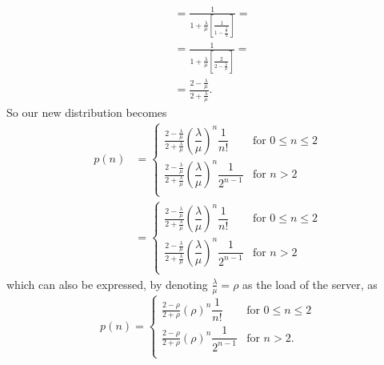 \documentclass[12pt]{article}
\begin{document}
\begin{enumerate}
\begin{align*}
			&=\frac{1}{1+\frac{\lambda}{\mu}\left[\frac{1}{1-\frac{\frac{\lambda}{\mu}}{2}}\right]}=\\
			&=\frac{1}{1+\frac{\lambda}{\mu}\left[\frac{2}{2-\frac{\lambda}{\mu}}\right]}=\\
			&=\frac{2-\frac{\lambda}{\mu}}{2+\frac{\lambda}{\mu}}.
		\end{align*}
		So our new distribution becomes
		\begin{align*}
			p(n)&=\begin{cases}
				\frac{2-\frac{\lambda}{\mu}}{2+\frac{\lambda}{\mu}}\left(\dfrac{\lambda}{\mu}\right)^{n}\dfrac{1}{n!}&\text{for }0\leqslant n\leqslant 2\\
				\frac{2-\frac{\lambda}{\mu}}{2+\frac{\lambda}{\mu}}\left(\dfrac{\lambda}{\mu}\right)^{n}\dfrac{1}{2^{n-1}}&\text{for }n> 2\\
			\end{cases}\\
			&=\begin{cases}
				\frac{2-\frac{\lambda}{\mu}}{2+\frac{\lambda}{\mu}}\left(\dfrac{\lambda}{\mu}\right)^{n}\dfrac{1}{n!}&\text{for }0\leqslant n\leqslant 2\\
				\frac{2-\frac{\lambda}{\mu}}{2+\frac{\lambda}{\mu}}\left(\dfrac{\lambda}{\mu}\right)^{n}\dfrac{1}{2^{n-1}}&\text{for }n> 2\\
			\end{cases}
		\end{align*}
		which can also be expressed, by denoting $\frac{\lambda}{\mu}=\rho$ as the load of the server, as
		\begin{equation*}
			p(n)=\begin{cases}
				\frac{2-\rho}{2+\rho}\left(\rho\right)^{n}\dfrac{1}{n!}&\text{for }0\leqslant n\leqslant 2\\
				\frac{2-\rho}{2+\rho}\left(\rho\right)^{n}\dfrac{1}{2^{n-1}}&\text{for }n> 2.\\
			\end{cases}
		\end{equation*}
	\end{enumerate}
\end{document}
